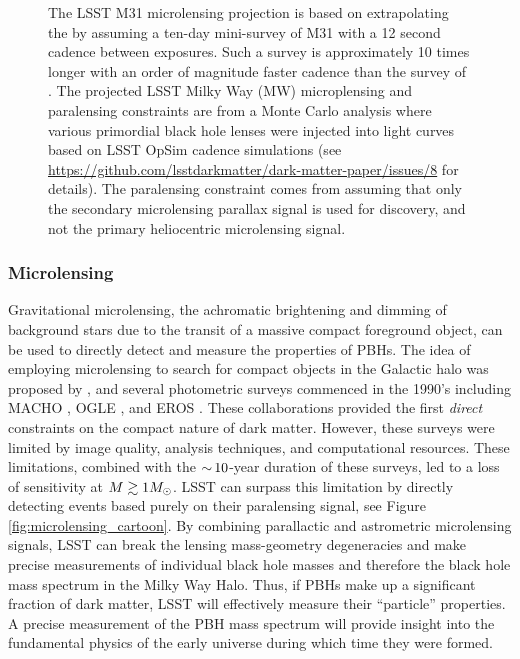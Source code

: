 \begin{figure}[t]
{    The LSST M31 microlensing projection is based on extrapolating the \citet{2017arXiv170102151N} by assuming a ten-day mini-survey of M31 with a 12 second cadence between exposures.
    Such a survey is approximately 10 times longer with an order of magnitude faster cadence than the survey of \citet{2017arXiv170102151N}.
    The projected LSST Milky Way (MW) microplensing and paralensing constraints are from a Monte Carlo analysis where various primordial black hole lenses were injected into light curves based on LSST OpSim cadence simulations (see \url{https://github.com/lsstdarkmatter/dark-matter-paper/issues/8} for details).
    The paralensing constraint comes from assuming that only the secondary microlensing parallax signal is used for discovery, and not the primary heliocentric microlensing signal.
}
\end{figure}

\subsubsection{Microlensing}
\label{sec:microlensing}

Gravitational microlensing, the achromatic brightening and dimming of background stars due to the transit of a massive compact foreground object, can be used to directly detect and measure the properties of PBHs.
The idea of employing microlensing to search for compact objects in the Galactic halo was proposed by \citet{1986ApJ...304....1P}, and several photometric surveys commenced in the 1990's including MACHO \citep{1992ASPC...34..193A}, OGLE \citep{1992AcA....42..253U}, and EROS \citep{1993Msngr..72...20A}.
These collaborations provided the first \emph{direct} constraints on the compact nature of dark matter. 
However, these surveys were limited by image quality, analysis techniques, and computational resources.
These limitations, combined with the $ {\sim}\,10$-year duration of these surveys, led to a loss of sensitivity at $M \gtrsim 1 M_\odot$.
LSST can surpass this limitation by directly detecting events based purely on their paralensing signal, see Figure \ref{fig:microlensing_cartoon}.
By combining parallactic and astrometric microlensing signals, LSST can break the lensing mass-geometry degeneracies and make precise measurements of individual black hole masses and therefore the black hole mass spectrum in the Milky Way Halo.
Thus, if PBHs make up a significant fraction of dark matter, LSST will effectively measure their ``particle'' properties. 
A precise measurement of the PBH mass spectrum will provide insight into the fundamental physics of the early universe during which time they were formed.

